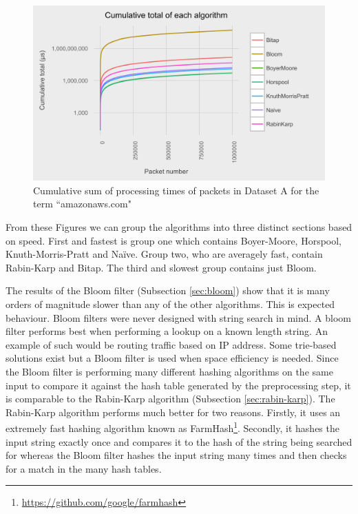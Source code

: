 \documentclass{article}
\begin{document}
\begin{figure}[h!bt]
  \centering
  \includegraphics[width=\textwidth]{graphs/cum_sum_packets_amazonaws-com.png}
  \caption{Cumulative sum of processing times of packets in Dataset A for the term ``amazonaws.com"}
  \label{fig:packets-cum-sum-amazonaws}
\end{figure}

From these Figures we can group the algorithms into three distinct sections based on speed. First and fastest is group one which contains Boyer-Moore, Horspool, Knuth-Morris-Pratt and Na{\"i}ve. Group two, who are averagely fast, contain Rabin-Karp and Bitap. The third and slowest group contains just Bloom.

The results of the Bloom filter \citep{Bloom1970} (Subsection \ref{sec:bloom}) show that it is many orders of magnitude slower than any of the other algorithms. This is expected behaviour. Bloom filters were never designed with string search in mind. A bloom filter performs best when performing a lookup on a known length string. An example of such would be routing traffic based on IP address. Some trie-based solutions exist but a Bloom filter is used when space efficiency is needed. Since the Bloom filter is performing many different hashing algorithms on the same input to compare it against the hash table generated by the preprocessing step, it is comparable to the Rabin-Karp algorithm \citep{Karp1987} (Subsection \ref{sec:rabin-karp}). The Rabin-Karp algorithm performs much better for two reasons. Firstly, it uses an extremely fast hashing algorithm known as FarmHash\footnote{\url{https://github.com/google/farmhash}}. Secondly, it hashes the input string exactly once and compares it to the hash of the string being searched for whereas the Bloom filter hashes the input string many times and then checks for a match in the many hash tables.
\end{document}
